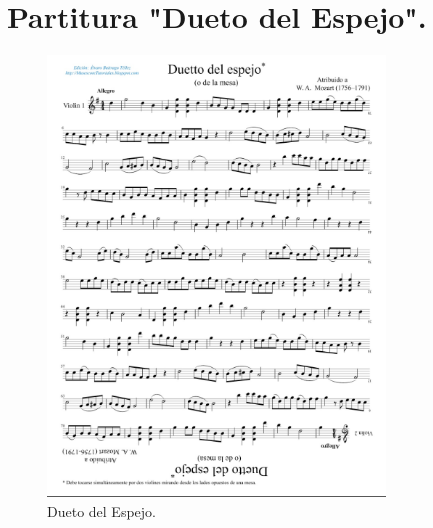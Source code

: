 \documentclass[a4paper, openright, 11pt, titlepage]{report}
\theoremstyle{definition}\newtheorem{defin}[propo]{Definition}
\theoremstyle{definition}\newtheorem{obser}[propo]{Remark}
\theoremstyle{definition}\newtheorem{ejem}[propo]{Ejemplo}
\theoremstyle{definition}\newtheorem{algoritmo}[propo]{Algoritmo}
\begin{document}
\chapter{Partitura "Dueto del Espejo".}
\begin{figure}[H]
    \centering
    \includegraphics[width = 0.8\textwidth]{Images/Apéndices/Apéndice C/duettoMozart.png}
    \caption{Dueto del Espejo.}
    \label{fig:my_label}
\end{figure}
\end{document}
